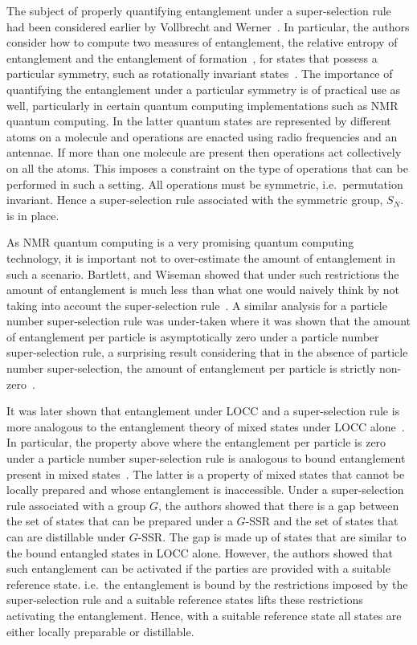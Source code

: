 \documentclass{article}
\begin{document}
The subject of properly quantifying entanglement under a super-selection rule had been considered earlier by Vollbrecht and Werner~\cite{VW01}.  In particular, the authors consider how to compute two measures of entanglement, the relative entropy of entanglement and the entanglement of formation~\cite{BDSW96}, for states that possess a particular symmetry, such as rotationally invariant states~\cite{W89}.  The importance of quantifying the entanglement under a particular symmetry is of practical use as well, particularly in certain quantum computing implementations such as NMR quantum computing.  In the latter quantum states are represented by different atoms on a molecule and operations are enacted using radio frequencies and an antennae.  If more than one molecule are present then operations act collectively on all the atoms.  This imposes a constraint on the type of operations that can be performed in such a setting.  All operations must be symmetric, i.e.~permutation invariant.  Hence a super-selection rule associated with the symmetric group, $S_N$. is in place.  

As NMR quantum computing is a very promising quantum computing technology, it is important not to over-estimate the amount of entanglement in such a scenario.  Bartlett, and Wiseman showed that under such restrictions the amount of entanglement is much less than what one would naively think by not taking into account the super-selection rule~\cite{BW03, WBV03}.  A similar analysis for a particle number super-selection rule was under-taken where it was shown that the amount of entanglement per particle is asymptotically zero under a particle number super-selection rule, a surprising result considering that in the absence of particle number super-selection, the amount of entanglement per particle is strictly non-zero~\cite{WV03,WBV03}.     

It was later shown that entanglement under LOCC and a super-selection rule is more analogous to the entanglement theory of mixed states under LOCC alone~\cite{BDSW06,JWBVP06}.  In particular, the property above where the entanglement per particle is zero under a particle number super-selection rule is analogous to bound entanglement present in mixed states~\cite{HHH98}.  The latter is a property of mixed states that cannot be locally prepared and whose entanglement is inaccessible.  Under a super-selection rule associated with a group $G$, the authors showed that there is a gap between the set of states that can be prepared under a $G$-SSR and the set of states that can are distillable under $G$-SSR.  The gap is made up of states that are similar to the bound entangled states in LOCC alone.  However, the authors showed that such entanglement can be activated if the parties are provided with a suitable reference state. i.e.~the entanglement is bound by the restrictions imposed by the super-selection rule and a suitable reference states lifts these restrictions activating the entanglement.  Hence, with a suitable reference state all states are either locally preparable or distillable.   
 
\end{document}
